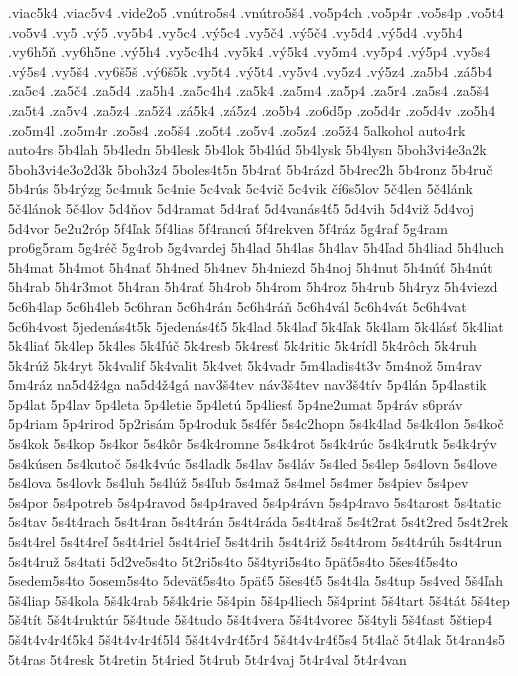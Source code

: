 {.viac5k4
.viac5v4
.vide2o5
.vnútro5s4
.vnútro5š4
.vo5p4ch
.vo5p4r
.vo5s4p
.vo5t4
.vo5v4
.vy5
.vý5
.vy5b4
.vy5c4
.vý5c4
.vy5č4
.vý5č4
.vy5d4
.vý5d4
.vy5h4
.vy6h5ň
.vy6h5ne
.vý5h4
.vy5c4h4
.vy5k4
.vý5k4
.vy5m4
.vy5p4
.vý5p4
.vy5s4
.vý5s4
.vy5š4
.vy6š5š
.vý6š5k
.vy5t4
.vý5t4
.vy5v4
.vy5z4
.vý5z4
.za5b4
.zá5b4
.za5c4
.za5č4
.za5d4
.za5h4
.za5c4h4
.za5k4
.za5m4
.za5p4
.za5r4
.za5s4
.za5š4
.za5t4
.za5v4
.za5z4
.za5ž4
.zá5k4
.zá5z4
.zo5b4
.zo6d5p
.zo5d4r
.zo5d4v
.zo5h4
.zo5m4l
.zo5m4r
.zo5s4
.zo5š4
.zo5t4
.zo5v4
.zo5z4
.zo5ž4
5alkohol
auto4rk
auto4rs
5b4lah
5b4ledn
5b4lesk
5b4lok
5b4lúd
5b4lysk
5b4lysn
5boh3vi4e3a2k
5boh3vi4e3o2d3k
5boh3z4
5boles4t5n
5b4rať
5b4rázd
5b4rec2h
5b4ronz
5b4ruč
5b4rús
5b4rýzg
5c4muk
5c4nie
5c4vak
5c4vič
5c4vik
čí6s5lov
5č4len
5č4lánk
5č4lánok
5č4lov
5d4ňov
5d4ramat
5d4rať
5d4vanás4ť5
5d4vih
5d4viž
5d4voj
5d4vor
5e2u2róp
5f4ľak
5f4lias
5f4rancú
5f4rekven
5f4ráz
5g4raf
5g4ram
pro6g5ram
5g4réč
5g4rob
5g4vardej
5h4lad
5h4las
5h4lav
5h4ľad
5h4liad
5h4luch
5h4mat
5h4mot
5h4nať
5h4ned
5h4nev
5h4niezd
5h4noj
5h4nut
5h4núť
5h4nút
5h4rab
5h4r3mot
5h4ran
5h4rať
5h4rob
5h4rom
5h4roz
5h4rub
5h4ryz
5h4viezd
5c6h4lap
5c6h4leb
5c6hran
5c6h4rán
5c6h4ráň
5c6h4vál
5c6h4vát
5c6h4vat
5c6h4vost
5jedenás4t5k
5jedenás4ť5
5k4lad
5k4laď
5k4ľak
5k4lam
5k4lásť
5k4liat
5k4liať
5k4lep
5k4les
5k4ľúč
5k4resb
5k4resť
5k4ritic
5k4rídl
5k4rôch
5k4ruh
5k4rúž
5k4ryt
5k4valif
5k4valit
5k4vet
5k4vadr
5m4ladis4t3v
5m4nož
5m4rav
5m4ráz
na5d4ž4ga
na5d4ž4gá
nav3š4tev
náv3š4tev
nav3š4tív
5p4lán
5p4lastik
5p4lat
5p4lav
5p4leta
5p4letie
5p4letú
5p4liesť
5p4ne2umat
5p4ráv
s6práv
5p4riam
5p4rirod
5p2risám
5p4roduk
5s4fér
5s4c2hopn
5s4k4lad
5s4k4lon
5s4koč
5s4kok
5s4kop
5s4kor
5s4kôr
5s4k4romne
5s4k4rot
5s4k4rúc
5s4k4rutk
5s4k4rýv
5s4kúsen
5s4kutoč
5s4k4vúc
5s4ladk
5s4lav
5s4láv
5s4led
5s4lep
5s4lovn
5s4love
5s4lova
5s4lovk
5s4luh
5s4lúž
5s4ľub
5s4maž
5s4mel
5s4mer
5s4piev
5s4pev
5s4por
5s4potreb
5s4p4ravod
5s4p4raved
5s4p4rávn
5s4p4ravo
5s4tarost
5s4tatic
5s4tav
5s4t4rach
5s4t4ran
5s4t4rán
5s4t4ráda
5s4t4raš
5s4t2rat
5s4t2red
5s4t2rek
5s4t4rel
5s4t4reľ
5s4t4riel
5s4t4rieľ
5s4t4rih
5s4t4riž
5s4t4rom
5s4t4rúh
5s4t4run
5s4t4ruž
5s4tati
5d2ve5s4to
5t2ri5s4to
5š4tyri5s4to
5päť5s4to
5šes4ť5s4to
5sedem5s4to
5osem5s4to
5deväť5s4to
5päť5
5šes4ť5
5s4t4la
5s4tup
5s4ved
5š4ľah
5š4liap
5š4kola
5š4k4rab
5š4k4rie
5š4pin
5š4p4liech
5š4print
5š4tart
5š4tát
5š4tep
5š4tít
5š4t4ruktúr
5š4tude
5š4tudo
5š4t4vera
5š4t4vorec
5š4tyli
5š4ťast
5štiep4
5š4t4v4r4ť5k4
5š4t4v4r4ť5l4
5š4t4v4r4ť5r4
5š4t4v4r4ť5s4
5t4lač
5t4lak
5t4ran4s5
5t4ras
5t4resk
5t4retin
5t4ried
5t4rub
5t4r4vaj
5t4r4val
5t4r4van
}
